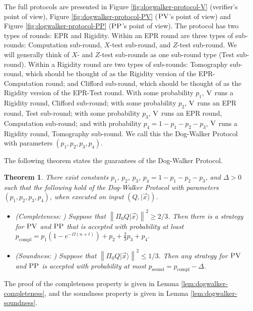 \documentclass[11pt,letter]{article}
\newtheorem{theorem}{Theorem}
\theoremstyle{remark}
\theoremstyle{definition}
\newcommand{\ket}[1]{|#1\rangle}
\newcommand{\ver}{\textsc{V}}
\newcommand{\pv}{\textsc{PV}}
\newcommand{\pp}{\textsc{PP}}
\newcommand{\norm}[1]{\left\|#1\right\|}
\begin{document}
The full protocols are presented in Figure \ref{fig:dogwalker-protocol-V} (verifier's point of view), Figure \ref{fig:dogwalker-protocol-PV} ($\pv$'s point of view) and Figure \ref{fig:dogwalker-protocol-PP} ($\pp$'s point of view). The protocol has two types of rounds: EPR and Rigidity. Within an EPR round are three types of sub-rounds: Computation sub-round, $X$-test sub-round, and $Z$-test sub-round. We will generally think of $X$- and $Z$-test sub-rounds as one sub-round type (Test sub-round). Within a Rigidity round are two types of sub-rounds: Tomography sub-round, which should be thought of as the Rigidity version of the EPR-Computation round; and Clifford sub-round, which should be thought of as the Rigidity version of the EPR-Test round. With some probability $p_1$, $\ver$ runs a Rigidity round, Clifford sub-round; with some probability $p_2$, $\ver$ runs an EPR round, Test sub-round; with some probability $p_3$, $\ver$ runs an EPR round, Computation sub-round; and with probability $p_4=1-p_1-p_2-p_3$, $\ver$ runs a Rigidity round, Tomography sub-round. We call this the Dog-Walker Protocol with parameters $(p_1,p_2,p_3,p_4)$.


The following theorem states the guarantees of the Dog-Walker Protocol.

\begin{theorem}\label{thm:dog-walker}
There exist constants $p_1$, $p_2$, $p_3$, $p_4=1-p_1-p_2-p_3$, and $\Delta>0$ such that the following hold of the Dog-Walker Protocol with parameters $(p_1,p_2,p_3,p_4)$, when executed on input $(Q,\ket{\vec{x}})$.
\begin{itemize}
\item (Completeness: ) Suppose that $\norm{\Pi_0Q\ket{\vec{x}}}^2\geq 2/3$. Then
  there is a strategy for $\pv$ and $\pp$ that is accepted with probability at
    least $p_{\mathrm{compl}}=p_1(1-e^{-\Omega(n+t)})+p_2+\frac{2}{3}p_3 +
    p_4$. 
\item (Soundness: ) Suppose that $\norm{\Pi_0Q\ket{\vec{x}}}^2\leq 1/3$. Then any strategy for $\pv$ and $\pp$ is accepted with probability at most $p_{\mathrm{sound}}=p_{\mathrm{compl}}-\Delta$. 
\end{itemize}
\end{theorem}
The proof of the completeness property is given in Lemma \ref{lem:dogwalker-completeness}, and the soundness property is given in Lemma \ref{lem:dogwalker-soundness}. 
\end{document}

